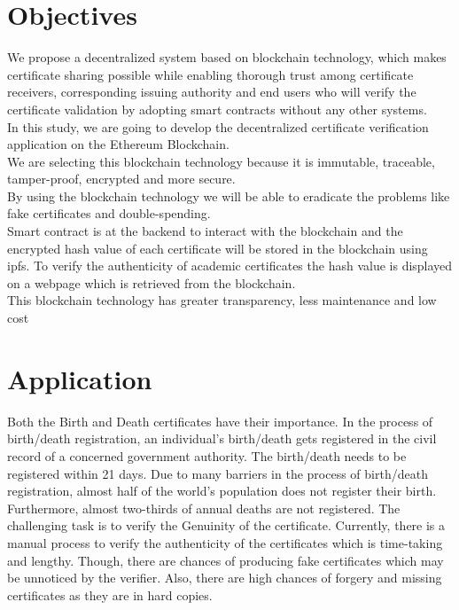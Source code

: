 \section{Objectives}
We  propose a decentralized system based on blockchain technology, which makes certificate sharing possible while enabling thorough trust among certificate receivers, corresponding issuing authority and end users who will verify the certificate validation by adopting smart contracts without any other systems. \\

In this study, we are going to develop the decentralized certificate verification application on the Ethereum Blockchain.\\ 

We are selecting this blockchain technology because it is immutable, traceable, tamper-proof, encrypted and more secure. \\

By using the blockchain technology we will be able to eradicate the problems like fake certificates and double-spending. \\

Smart contract is at the backend to interact with the blockchain and the encrypted hash value of each certificate will be stored in the blockchain using ipfs. To verify the authenticity of academic certificates the hash value is displayed on a webpage which is retrieved from the blockchain. \\

This blockchain technology has greater transparency, less maintenance and low cost 

\section{Application}
Both the Birth and Death certificates have their importance. In the process of birth/death registration, an individual’s birth/death gets registered in the civil record of a concerned government authority. The birth/death needs to be registered within 21 days. Due to many barriers in the process of birth/death registration, almost half of the world’s population does not register their birth. Furthermore, almost two-thirds of annual deaths are not registered. The challenging task is to verify the Genuinity of the certificate. Currently, there is a manual process to verify the authenticity of the certificates which is time-taking and lengthy. Though, there are chances of producing fake certificates which may be unnoticed by the verifier. Also, there are high chances of forgery and missing certificates as they are in hard copies.
